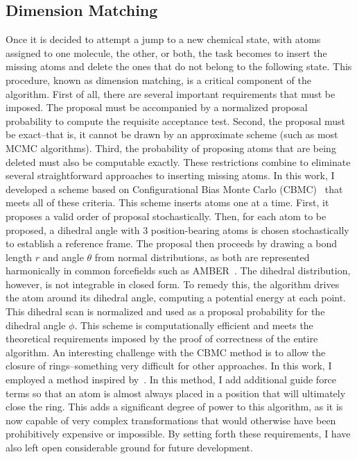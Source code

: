 \subsection{Dimension Matching}
%
Once it is decided to attempt a jump to a new chemical state, with atoms assigned to one molecule, the other, or both, the task becomes to insert the missing atoms and delete the ones that do not belong to the following state.
%
This procedure, known as dimension matching, is a critical component of the algorithm.
%
First of all, there are several important requirements that must be imposed.
%
The proposal must be accompanied by a normalized proposal probability to compute the requisite acceptance test.
%
Second, the proposal must be exact--that is, it cannot be drawn by an approximate scheme (such as most MCMC algorithms).
%
Third, the probability of proposing atoms that are being deleted must also be computable exactly.
%
These restrictions combine to eliminate several straightforward approaches to inserting missing atoms.
%
In this work, I developed a scheme based on Configurational Bias Monte Carlo (CBMC)~\cite{Siepmann1992} that meets all of these criteria.
%
This scheme inserts atoms one at a time.
%
First, it proposes a valid order of proposal stochastically.
%
Then, for each atom to be proposed, a dihedral angle with 3 position-bearing atoms is chosen stochastically to establish a reference frame.
%
The proposal then proceeds by drawing a bond length $r$ and angle $\theta$ from normal distributions, as both are represented harmonically in common forcefields such as AMBER~\cite{Ponder2003}.
%
The dihedral distribution, however, is not integrable in closed form.
%
To remedy this, the algorithm drives the atom around its dihedral angle, computing a potential energy at each point.
%
This dihedral scan is normalized and used as a proposal probability for the dihedral angle $\phi$.
%
This scheme is computationally efficient and meets the theoretical requirements imposed by the proof of correctness of the entire algorithm.
%
An interesting challenge with the CBMC method is to allow the closure of rings--something very difficult for other approaches.
%
In this work, I employed a method inspired by~\cite{Wick2000}.
%
In this method, I add additional guide force terms so that an atom is almost always placed in a position that will ultimately close the ring.
%
This adds a significant degree of power to this algorithm, as it is now capable of very complex transformations that would otherwise have been prohibitively expensive or impossible.
%
By setting forth these requirements, I have also left open considerable ground for future development.

